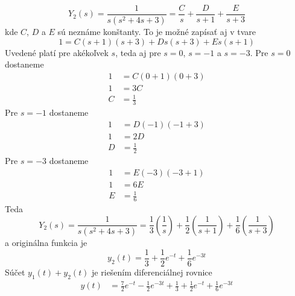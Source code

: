 \documentclass[a4paper, 10pt, ]{article}
\begin{document}
\begin{itemize}[leftmargin=0pt, labelsep=3mm, itemsep=0pt]
    \begin{equation}
        Y_2(s) = \frac{1}{s(s^2 + 4 s + 3)} = \frac{C}{s} + \frac{D}{s + 1} + \frac{E}{s + 3}
    \end{equation}
    kde $C$, $D$ a $E$ sú neznáme konštanty. To je možné zapísať aj v tvare
    \begin{equation}
        1 = C (s + 1)(s + 3) + D s (s + 3) + E s (s + 1)
    \end{equation}
    Uvedené platí pre akékoľvek $s$, teda aj pre $s = 0$, $s = -1$ a $s = -3$. Pre $s = 0$ dostaneme
    \begin{subequations}
        \begin{align}
            1 &= C (0 + 1)(0 + 3) \\
            1 &= 3 C \\
            C &= \frac{1}{3}
        \end{align}
    \end{subequations}
    Pre $s = -1$ dostaneme
    \begin{subequations}
        \begin{align}
            1 &= D (-1)(-1 + 3) \\
            1 &= 2 D \\
            D &= \frac{1}{2}
        \end{align}
    \end{subequations}
    Pre $s = -3$ dostaneme
    \begin{subequations}
        \begin{align}
            1 &= E (-3)(-3 + 1) \\
            1 &= 6 E \\
            E &= \frac{1}{6}
        \end{align}
    \end{subequations}
    Teda
    \begin{equation}
        Y_2(s) = \frac{1}{s(s^2 + 4 s + 3)} = \frac{1}{3} \left( \frac{1}{s} \right) + \frac{1}{2} \left( \frac{1}{s + 1} \right) + \frac{1}{6} \left( \frac{1}{s + 3} \right)
    \end{equation}
    a originálna funkcia je
    \begin{equation}
        y_2(t) = \frac{1}{3} + \frac{1}{2} e^{-t} + \frac{1}{6} e^{-3t}
    \end{equation}
    Súčet $y_1(t) + y_2(t)$ je riešením diferenciálnej rovnice
    \begin{subequations}
        \begin{align}
            y(t) &= \frac{7}{2} e^{-t} - \frac{1}{2} e^{-3t} + \frac{1}{3} + \frac{1}{2} e^{-t} + \frac{1}{6} e^{-3t} \\

\end{align}
\end{subequations}
\end{itemize}
\end{document}
